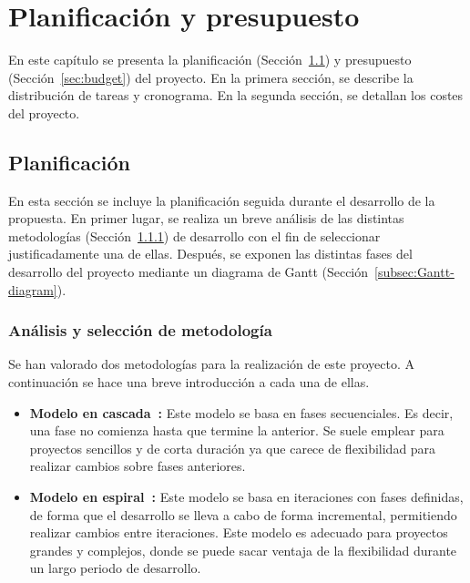 \chapter{Planificación y presupuesto}\label{chap:planning}
En este capítulo se presenta la planificación (Sección~\ref{sec:planning}) y presupuesto (Sección~\ref{sec:budget}) del proyecto. En la primera sección, se describe la distribución de tareas y cronograma. En la segunda sección, se detallan los costes del proyecto.

\section{Planificación}\label{sec:planning}
En esta sección se incluye la planificación seguida durante el desarrollo de la propuesta. En primer lugar, se realiza un breve análisis de las distintas metodologías (Sección~\ref{subsec:metodology}) de desarrollo con el fin de seleccionar justificadamente una de ellas. Después, se exponen las distintas fases del desarrollo del proyecto mediante un diagrama de Gantt (Sección~\ref{subsec:Gantt-diagram}).

\subsection{Análisis y selección de metodología}\label{subsec:metodology}
Se han valorado dos metodologías para la realización de este proyecto. A continuación se hace una breve introducción a cada una de ellas.

\begin{itemize}
    \item \textbf{Modelo en cascada~\cite{cascade}:} Este modelo se basa en fases secuenciales. Es decir, una fase no comienza hasta que termine la anterior. Se suele emplear para proyectos sencillos y de corta duración ya que carece de flexibilidad para realizar cambios sobre fases anteriores.
    \item \textbf{Modelo en espiral~\cite{spiral}:} Este modelo se basa en iteraciones con fases definidas, de forma que el desarrollo se lleva a cabo de forma incremental, permitiendo realizar cambios entre iteraciones. Este modelo es adecuado para proyectos grandes y complejos, donde se puede sacar ventaja de la flexibilidad durante un largo periodo de desarrollo.
\end{itemize}

